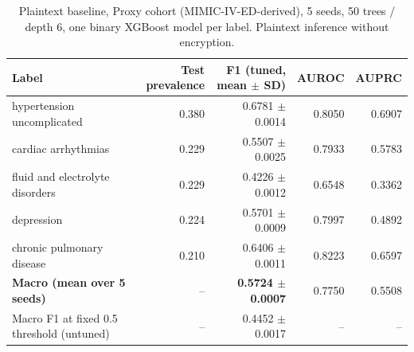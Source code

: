 \begin{table}[t]
\centering
\caption{Plaintext baseline, {Proxy cohort (MIMIC-IV-ED-derived)}, 5 seeds, 50 trees / depth 6, one binary XGBoost model per label. Plaintext inference without encryption.}
\label{tab:t2_plaintext_baseline}
\begin{tabular}{lrrrr}
\toprule
Label & Test prevalence & F1 (tuned, mean $\pm$ SD) & AUROC & AUPRC \\
\midrule
hypertension uncomplicated & 0.380 & 0.6781 $\pm$ 0.0014 & 0.8050 & 0.6907 \\
cardiac arrhythmias & 0.229 & 0.5507 $\pm$ 0.0025 & 0.7933 & 0.5783 \\
fluid and electrolyte disorders & 0.229 & 0.4226 $\pm$ 0.0012 & 0.6548 & 0.3362 \\
depression & 0.224 & 0.5701 $\pm$ 0.0009 & 0.7997 & 0.4892 \\
chronic pulmonary disease & 0.210 & 0.6406 $\pm$ 0.0011 & 0.8223 & 0.6597 \\
\midrule
\textbf{Macro (mean over 5 seeds)} & -- & \textbf{0.5724 $\pm$ 0.0007} & 0.7750 & 0.5508 \\
Macro F1 at fixed 0.5 threshold (untuned) & -- & 0.4452 $\pm$ 0.0017 & -- & -- \\
\bottomrule
\end{tabular}
\end{table}
